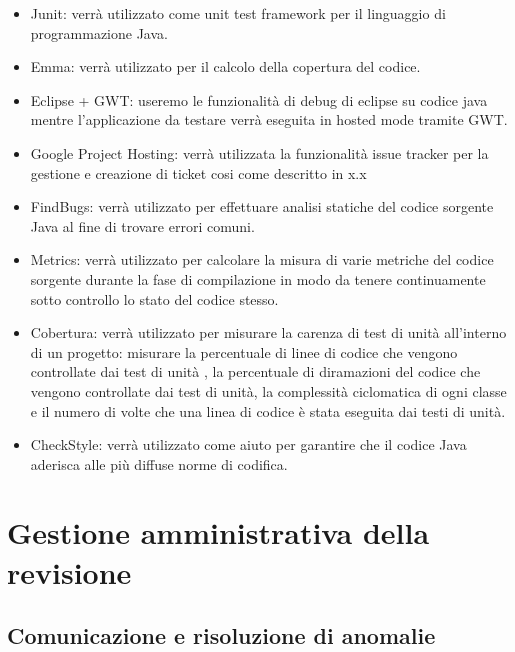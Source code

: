 \begin{itemize}

\item Junit: verr\`a utilizzato come unit test framework per il linguaggio di
programmazione Java.

\item Emma: verr\`a utilizzato per il calcolo della copertura del codice.

\item Eclipse + GWT: useremo le funzionalit\`a di debug di eclipse su codice java
mentre l'applicazione da testare verr\`a eseguita in hosted mode tramite GWT.

\item Google Project Hosting: verr\`a utilizzata la funzionalit\`a issue tracker per
la gestione e creazione di ticket cosi come descritto in x.x

\item FindBugs: verr\`a utilizzato per effettuare analisi statiche del codice
sorgente Java al fine di trovare errori comuni.

\item Metrics: verr\`a utilizzato per calcolare la misura di varie metriche del
codice sorgente durante la fase di compilazione in modo da tenere continuamente
sotto controllo lo stato del codice stesso.

\item Cobertura: verr\`a utilizzato per misurare la carenza di test di unit\`a
all'interno di un progetto: misurare la percentuale di linee di codice che
vengono controllate dai test di unit\`a , la percentuale di diramazioni del
codice che vengono controllate dai test di unit\`a, la complessit\`a ciclomatica
di ogni classe e il numero di volte che una linea di codice \`e stata eseguita
dai testi di unit\`a.

\item CheckStyle: verr\`a utilizzato come aiuto per garantire che il codice Java
aderisca alle pi\`u diffuse norme di codifica.
\end{itemize}



\chapter{Gestione amministrativa della revisione}
\thispagestyle{fancy} %

\section{Comunicazione e risoluzione di anomalie}

